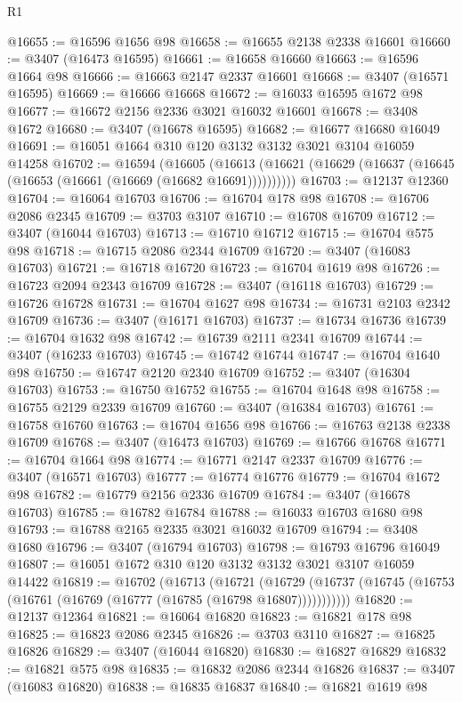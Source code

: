 \begin{lexlean}{R1}
\begin{coremodule}
@16655 := @16596 @1656 @98
@16658 := @16655 @2138 @2338 @16601
@16660 := @3407 (@16473 @16595)
@16661 := @16658 @16660
@16663 := @16596 @1664 @98
@16666 := @16663 @2147 @2337 @16601
@16668 := @3407 (@16571 @16595)
@16669 := @16666 @16668
@16672 := @16033 @16595 @1672 @98
@16677 := @16672 @2156 @2336 @3021 @16032 @16601
@16678 := @3408 @1672
@16680 := @3407 (@16678 @16595)
@16682 := @16677 @16680 @16049
@16691 := @16051 @1664 @310 @120 @3132 @3132 @3021 @3104 @16059 @14258
@16702 := @16594
    (@16605 (@16613 (@16621 (@16629 (@16637 (@16645 (@16653 (@16661 (@16669 (@16682 @16691))))))))))
@16703 := @12137 @12360
@16704 := @16064 @16703
@16706 := @16704 @178 @98
@16708 := @16706 @2086 @2345
@16709 := @3703 @3107
@16710 := @16708 @16709
@16712 := @3407 (@16044 @16703)
@16713 := @16710 @16712
@16715 := @16704 @575 @98
@16718 := @16715 @2086 @2344 @16709
@16720 := @3407 (@16083 @16703)
@16721 := @16718 @16720
@16723 := @16704 @1619 @98
@16726 := @16723 @2094 @2343 @16709
@16728 := @3407 (@16118 @16703)
@16729 := @16726 @16728
@16731 := @16704 @1627 @98
@16734 := @16731 @2103 @2342 @16709
@16736 := @3407 (@16171 @16703)
@16737 := @16734 @16736
@16739 := @16704 @1632 @98
@16742 := @16739 @2111 @2341 @16709
@16744 := @3407 (@16233 @16703)
@16745 := @16742 @16744
@16747 := @16704 @1640 @98
@16750 := @16747 @2120 @2340 @16709
@16752 := @3407 (@16304 @16703)
@16753 := @16750 @16752
@16755 := @16704 @1648 @98
@16758 := @16755 @2129 @2339 @16709
@16760 := @3407 (@16384 @16703)
@16761 := @16758 @16760
@16763 := @16704 @1656 @98
@16766 := @16763 @2138 @2338 @16709
@16768 := @3407 (@16473 @16703)
@16769 := @16766 @16768
@16771 := @16704 @1664 @98
@16774 := @16771 @2147 @2337 @16709
@16776 := @3407 (@16571 @16703)
@16777 := @16774 @16776
@16779 := @16704 @1672 @98
@16782 := @16779 @2156 @2336 @16709
@16784 := @3407 (@16678 @16703)
@16785 := @16782 @16784
@16788 := @16033 @16703 @1680 @98
@16793 := @16788 @2165 @2335 @3021 @16032 @16709
@16794 := @3408 @1680
@16796 := @3407 (@16794 @16703)
@16798 := @16793 @16796 @16049
@16807 := @16051 @1672 @310 @120 @3132 @3132 @3021 @3107 @16059 @14422
@16819 := @16702
    (@16713
      (@16721
        (@16729 (@16737 (@16745 (@16753 (@16761 (@16769 (@16777 (@16785 (@16798 @16807)))))))))))
@16820 := @12137 @12364
@16821 := @16064 @16820
@16823 := @16821 @178 @98
@16825 := @16823 @2086 @2345
@16826 := @3703 @3110
@16827 := @16825 @16826
@16829 := @3407 (@16044 @16820)
@16830 := @16827 @16829
@16832 := @16821 @575 @98
@16835 := @16832 @2086 @2344 @16826
@16837 := @3407 (@16083 @16820)
@16838 := @16835 @16837
@16840 := @16821 @1619 @98

\end{coremodule}
\end{lexlean}
